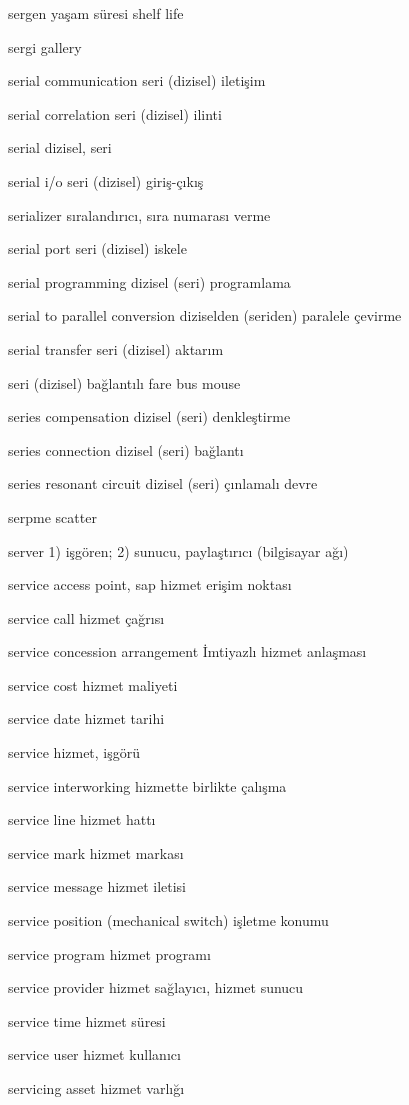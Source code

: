 \documentclass[12pt,fleqn]{article}\usepackage{../../common}
\begin{document}
sergen yaşam süresi shelf life

sergi gallery

serial communication seri (dizisel) iletişim

serial correlation seri (dizisel) ilinti

serial dizisel, seri

serial i/o seri (dizisel) giriş-çıkış

serializer sıralandırıcı, sıra numarası verme

serial port seri (dizisel) iskele

serial programming dizisel (seri) programlama

serial to parallel conversion diziselden (seriden) paralele çevirme

serial transfer seri (dizisel) aktarım

seri (dizisel) bağlantılı fare bus mouse

series compensation dizisel (seri) denkleştirme

series connection dizisel (seri) bağlantı

series resonant circuit dizisel (seri) çınlamalı devre

serpme scatter

server 1) işgören; 2) sunucu, paylaştırıcı (bilgisayar ağı)

service access point, sap hizmet erişim noktası

service call hizmet çağrısı

service concession arrangement İmtiyazlı hizmet anlaşması

service cost hizmet maliyeti

service date hizmet tarihi

service hizmet, işgörü

service interworking hizmette birlikte çalışma

service line hizmet hattı

service mark hizmet markası

service message hizmet iletisi

service position (mechanical switch) işletme konumu

service program hizmet programı

service provider hizmet sağlayıcı, hizmet sunucu

service time hizmet süresi

service user hizmet kullanıcı

servicing asset hizmet varlığı
\end{document}
